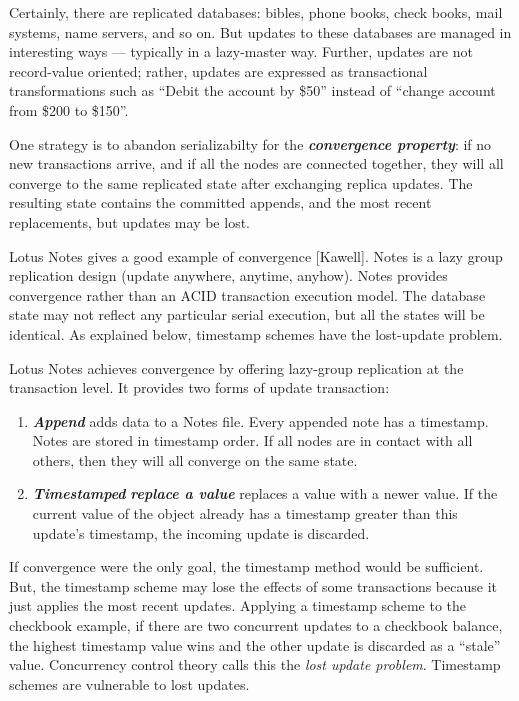 \documentclass[a4paper,11pt,twoside,openright]{article}
\begin{document}
Certainly, there are replicated databases: bibles, phone books, check
books, mail systems, name servers, and so on. But updates to these
databases are managed in interesting ways --- typically in a lazy-master
way. Further, updates are not record-value oriented; rather, updates are
expressed as transactional transformations such as ``Debit the account
by \$50'' instead of ``change account from \$200 to \$150''.

One strategy is to abandon serializabilty for the
\emph{\textbf{convergence property}}: if no new transactions arrive, and
if all the nodes are connected together, they will all converge to the
same replicated state after exchanging replica updates. The resulting
state contains the committed appends, and the most recent replacements,
but updates may be lost.

Lotus Notes gives a good example of convergence {[}Kawell{]}. Notes is a
lazy group replication design (update anywhere, anytime, anyhow). Notes
provides convergence rather than an ACID transaction execution model.
The database state may not reflect any particular serial execution, but
all the states will be identical. As explained below, timestamp schemes
have the lost-update problem.

Lotus Notes achieves convergence by offering lazy-group replication at
the transaction level. It provides two forms of update transaction:

\begin{enumerate}
\def\labelenumi{\arabic{enumi}.}
\item
  \emph{\textbf{Append}} adds data to a Notes file. Every appended note
  has a timestamp. Notes are stored in timestamp order. If all nodes are
  in contact with all others, then they will all converge on the same
  state.
\item
  \emph{\textbf{Timestamped}} \emph{\textbf{replace a value}} replaces a
  value with a newer value. If the current value of the object already
  has a timestamp greater than this update's timestamp, the incoming
  update is discarded.
\end{enumerate}

If convergence were the only goal, the timestamp method would be
sufficient. But, the timestamp scheme may lose the effects of some
transactions because it just applies the most recent updates. Applying a
timestamp scheme to the checkbook example, if there are two concurrent
updates to a checkbook balance, the highest timestamp value wins and the
other update is discarded as a ``stale'' value. Concurrency control
theory calls this the \emph{lost update problem}. Timestamp schemes are
vulnerable to lost updates.
\end{document}
